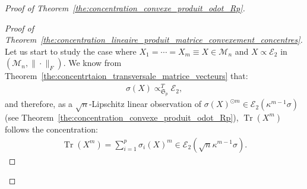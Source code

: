 \documentclass{ws-rmta}
\DeclareMathOperator{\tr}{Tr}
\begin{document}
\begin{proof}[Proof of Theorem~\ref{the:concentration_convexe_produit_odot_Rp}]
\begin{proof}[Proof of Theorem~\ref{the:concentration_lineaire_produit_matrice_convexement_concentres}]
  Let us start to study the case where $ X_1 = \cdots = X_m \equiv X \in \mathcal{M}_{n}$ and $X \propto \mathcal E_2$ in $(\mathcal{M}_{n}, \|\cdot \|_F)$. 
  We know from Theorem~\ref{the:concentrtaion_transversale_matrice_vecteurs} that:
  \begin{align*}
    \sigma(X) \propto_{\mathfrak S_p}^T \mathcal E_2,
  \end{align*}
  and therefore, as a $\sqrt{n}$-Lipschitz linear observation of $\sigma(X)^{\odot m} \in \mathcal E_2 \left( \kappa^{m-1} \sigma\right)$ (see Theorem~\ref{the:concentration_convexe_produit_odot_Rp}), $\tr(X^m)$ follows the concentration:
\begin{align*}
    \tr(X^m) = \sum_{i=1}^p \sigma_i(X)^m \in \mathcal E_2 \left( \sqrt n \kappa^{m-1} \sigma\right) .
\end{align*}

\end{proof}
\end{proof}
\end{document}
